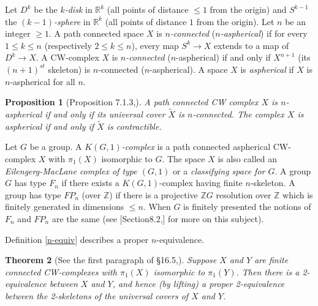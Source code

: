 \documentclass[12pt]{article}
\newtheorem{theorem}{Theorem}[subsection]
\newtheorem{proposition}[theorem]{Proposition}
\begin{document}
Let $D^k$ be the {\it $k$-disk} in $\mathbb R^{k}$ (all points of distance $\leq 1$ from the origin) and $S^{k-1}$ the {\it $(k-1)$-sphere} in $\mathbb R^k$ (all points of distance $1$ from the origin). Let $n$ be an integer $\geq 1$. A path connected space $X$ is {\it $n$-connected}  ({\it $n$-aspherical}) if for every $1\leq k\leq n$ (respectively $2\leq k\leq n$), every map $S^k\to X$ extends to a map of $D^k\to X$. A CW-complex $X$ is {\it $n$-connected} ($n$-aspherical) if and only if $X^{n+1}$ (its $(n+1)^{st}$ skeleton) is $n$-connected ($n$-aspherical). A space $X$ is {\it aspherical} if $X$ is $n$-aspherical for all $n$. 
\begin{proposition} [Proposition 7.1.3,\cite{G}] 
A path connected CW complex $X$ is $n$-aspherical if and only if its universal cover $\tilde X$ is $n$-connected. The complex $X$ is aspherical if and only if $\tilde X$ is contractible. 
\end{proposition}
Let $G$ be a group. A {\it $K(G,1)$-complex} is a path connected aspherical CW-complex $X$ with $\pi_1(X)$ isomorphic to $G$. The space $X$ is also called an {\it Eilengerg-MacLane complex of type $(G,1)$} or a {\it classifying space for $G$}.  A group $G$ has type $F_n$ if there exists a $K(G,1)$-complex having finite $n$-skeleton. A group has type $FP_n$ (over $\mathbb Z$) if there is a projective $\mathbb ZG$ resolution over $\mathbb Z$ which is finitely generated in dimensions $\leq n$. When $G$ is finitely presented the notions of $F_n$ and $FP_n$ are the same (see [Section8.2,\cite{G}] for more on this subject). 

Definition \ref{n-equiv} describes a proper $n$-equivalence. 

\begin{theorem} [See the first paragraph of \S 16.5,\cite{G}] \label{P1E} 
Suppose $X$ and $Y$ are finite connected CW-complexes with $\pi_1(X)$ isomorphic to $\pi_1(Y)$. Then there is a 2-equivalence between $X$ and $Y$, and hence (by lifting) a proper 2-equivalence between the 2-skeletons  of the universal covers of $X$ and $Y$.
\end{theorem}
\end{document}
